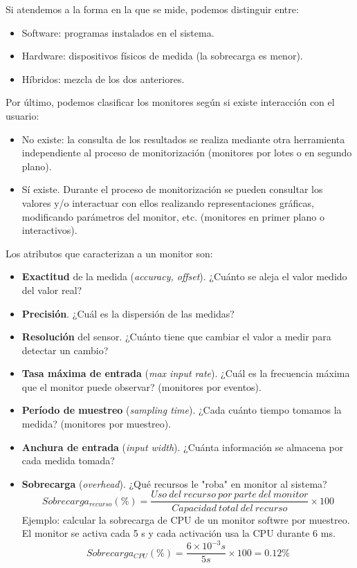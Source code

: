 \documentclass[12pt,spanish]{article}
\begin{document}
Si atendemos a la forma en la que se mide, podemos distinguir entre:
\begin{itemize}
	\item Software: programas instalados en el sistema.
	\item Hardware: dispositivos físicos de medida (la sobrecarga es menor).
	\item Híbridos: mezcla de los dos anteriores.
\end{itemize}

Por último, podemos clasificar los monitores según si existe interacción con el usuario:

\begin{itemize}
	\item No existe: la consulta de los resultados se realiza mediante otra herramienta independiente al proceso de monitorización (monitores por lotes o en segundo plano).
	\item Sí existe. Durante el proceso de monitorización se pueden consultar los valores y/o interactuar con ellos realizando representaciones gráficas, modificando parámetros del monitor, etc. (monitores en primer plano o interactivos).
\end{itemize}

Los atributos que caracterizan a un monitor son:

\begin{itemize}
	\item \textbf{Exactitud} de la medida (\textit{accuracy, offset}). ¿Cuánto se aleja el valor medido del valor real?
	\item \textbf{Precisión}. ¿Cuál es la dispersión de las medidas?
	\item \textbf{Resolución} del sensor. ¿Cuánto tiene que cambiar el valor a medir para detectar un cambio?
	\item \textbf{Tasa máxima de entrada} (\textit{max input rate}). ¿Cuál es la frecuencia máxima que el monitor puede observar? (monitores por eventos).
	\item \textbf{Período de muestreo} (\textit{sampling time}). ¿Cada cuánto tiempo tomamos la medida? (monitores por muestreo).
	\item \textbf{Anchura de entrada} (\textit{input width}). ¿Cuánta información se almacena por cada medida tomada?
	\item \textbf{Sobrecarga} (\textit{overhead}). ¿Qué recursos le "roba" en monitor al sistema?
	\[
		Sobrecarga_{recurso}(\%) = \frac{Uso\ del\ recurso\ por\ parte\ del\ monitor}{Capacidad\ total\ del\ recurso} \times 100
	\]
	Ejemplo: calcular la sobrecarga de CPU de un monitor softwre por muestreo. El monitor se activa cada 5 s y cada activación usa la CPU durante 6 ms.
	\[
		Sobrecarga_{CPU}(\%) = \frac{6 \times 10^{-3} s}{5 s} \times 100 = 0.12\%
	\]
\end{itemize}
\end{document}
